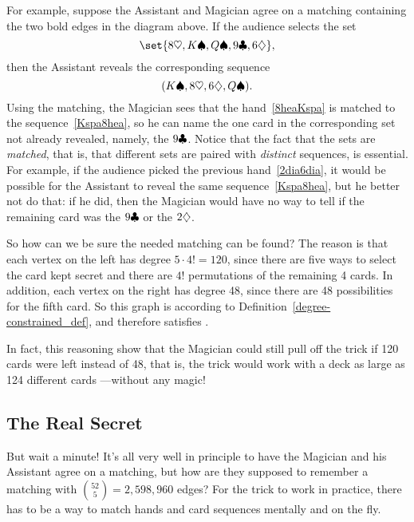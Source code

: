For example, suppose the Assistant and Magician agree on a matching
containing the two bold edges in the diagram above.  If the audience
selects the set
\begin{equation}\label{8heaKspa}
\set{8 \hea, K \spa, Q \spa, 9 \clu, 6 \dia},
\end{equation}
then the Assistant reveals the corresponding sequence
\begin{equation}\label{Kspa8hea}
(K \spadesuit, 8 \heartsuit, 6 \diamondsuit, Q \spadesuit).
\end{equation}
Using the matching, the Magician sees that the hand~\eqref{8heaKspa} is
matched to the sequence~\eqref{Kspa8hea}, so he can name the one card in
the corresponding set not already revealed, namely, the $9 \clubsuit$.  Notice
that the fact that the sets are \emph{matched}, that is, that different
sets are paired with \emph{distinct} sequences, is essential.  For
example, if the audience picked the previous hand~\eqref{2dia6dia}, it
would be possible for the Assistant to reveal the same
sequence~\eqref{Kspa8hea}, but he better not do that: if he did, then the
Magician would have no way to tell if the remaining card was the $9 \clubsuit$
or the $2 \diamondsuit$.

So how can we be sure the needed matching can be found?  The reason is
that each vertex on the left has degree $5 \cdot 4! = 120$, since there
are five ways to select the card kept secret and there are $4!$
permutations of the remaining 4 cards.  In addition, each vertex on the
right has degree 48, since there are 48 possibilities for the fifth card.
So this graph is \emph{} according to
Definition~\ref{degree-constrained_def}, and therefore satisfies .

In fact, this reasoning show that the Magician could still pull off the
trick if 120 cards were left instead of 48, that is, the trick would work
with a deck as large as 124 different cards ---without any magic!

\subsection{The Real Secret}

But wait a minute!  It's all very well in principle to have the Magician
and his Assistant agree on a matching, but how are they supposed to
remember a matching with $\binom{52}{5} = 2,598,960$ edges?  For the trick
to work in practice, there has to be a way to match hands and card
sequences mentally and on the fly.

